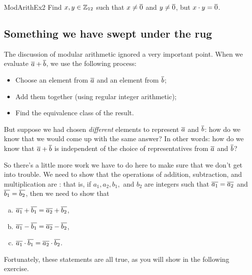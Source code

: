 \begin{exercise}{ModArithEx2}  
Find $x,y \in \mathbb{Z}_{12}$ such that $x \neq \overline{0}$ and $y \neq \overline{0}$, but $x \cdot y = \overline{0}$.
\end{exercise}

\subsection{Something we have swept under the rug} \label{EquivalenceRelationsWellDefSect}

The discussion of modular arithmetic ignored a very important point. When we evaluate $\overline{a} \mathbin{+} \overline{b}$, we use the following process:
\begin{itemize}
\item
Choose an element from  $\overline{a}$ and an element from $\overline{b}$;
\item
Add them together (using regular integer arithmetic);
\item
Find the equivalence class of the result. 
\end{itemize}

But suppose we had chosen \emph{different} elements to represent $\overline{a}$ and $\overline{b}$: how do we know that we would come up with the same answer? In other words: how do we know that $\overline{a} \mathbin{+} \overline{b}$ is independent of the choice of representatives from $\overline{a}$ and $\overline{b}$?

So there's a little more work we have to do here to make sure that we don't get into trouble. We need to show that  the operations of addition, subtraction, and multiplication are : that is, if $a_1, a_2, b_1,$ and $b_2$ are integers such that  $\overline{a_1} = \overline{a_2}$ and $\overline{b_1} = \overline{b_2}$, then we need to show that
\begin{enumerate}[(a)]
\item $\overline{a_1} \mathbin{+} \overline{b_1} = \overline{a_2} \mathbin{+} \overline{b_2}$,
\item $\overline{a_1} \mathbin{-} \overline{b_1} = \overline{a_2} \mathbin{-} \overline{b_2}$, 
\item $\overline{a_1} \cdot \overline{b_1} = \overline{a_2} \cdot \overline{b_2}$.
\end{enumerate}
Fortunately, these statements are all true, as you will show in the following exercise.

